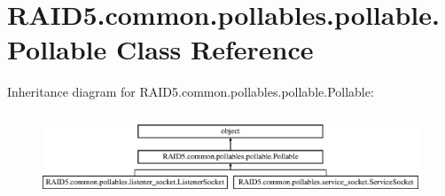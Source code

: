 \hypertarget{class_r_a_i_d5_1_1common_1_1pollables_1_1pollable_1_1_pollable}{}\section{R\+A\+I\+D5.\+common.\+pollables.\+pollable.\+Pollable Class Reference}
\label{class_r_a_i_d5_1_1common_1_1pollables_1_1pollable_1_1_pollable}
Inheritance diagram for R\+A\+I\+D5.\+common.\+pollables.\+pollable.\+Pollable\+:\begin{figure}[H]
\begin{center}
\leavevmode
\includegraphics[height=2.507463cm]{class_r_a_i_d5_1_1common_1_1pollables_1_1pollable_1_1_pollable}
\end{center}
\end{figure}
